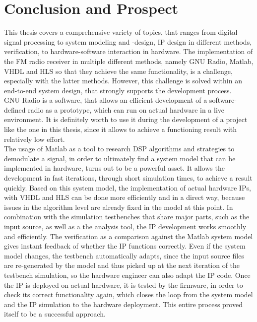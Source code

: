 \chapter{Conclusion and Prospect}
\label{cha:ConclusionAndProspect}

This thesis covers a comprehensive variety of topics, that ranges from digital signal processing to system modeling and -design, IP design in different methods, verification, to hardware-software interaction in hardware.
The implementation of the FM radio receiver in multiple different methods, namely GNU Radio, Matlab, VHDL and HLS so that they achieve the same functionality, is a challenge, especially with the latter methods.
However, this challenge is solved within an end-to-end system design, that strongly supports the development process.\\

GNU Radio is a software, that allows an efficient development of a software-defined radio as a prototype, which can run on actual hardware in a live environment.
It is definitely worth to use it during the development of a project like the one in this thesis, since it allows to achieve a functioning result with relatively low effort.\\

The usage of Matlab as a tool to research DSP algorithms and strategies to demodulate a signal, in order to ultimately find a system model that can be implemented in hardware, turns out to be a powerful asset.
It allows the development in fast iterations, through short simulation times, to achieve a result quickly.
Based on this system model, the implementation of actual hardware IPs, with VHDL and HLS can be done more efficiently and in a direct way, because issues in the algorithm level are already fixed in the model at this point.
In combination with the simulation testbenches that share major parts, such as the input source, as well as a the analysis tool, the IP development works smoothly and efficiently.
The verification as a comparison against the Matlab system model gives instant feedback of whether the IP functions correctly.
Even if the system model changes, the testbench automatically adapts, since the input source files are re-generated by the model and thus picked up at the next iteration of the testbench simulation, so the hardware engineer can also adapt the IP code.
Once the IP is deployed on actual hardware, it is tested by the firmware, in order to check its correct functionality again, which closes the loop from the system model and the IP simulation to the hardware deployment.
This entire process proved itself to be a successful approach.\\

